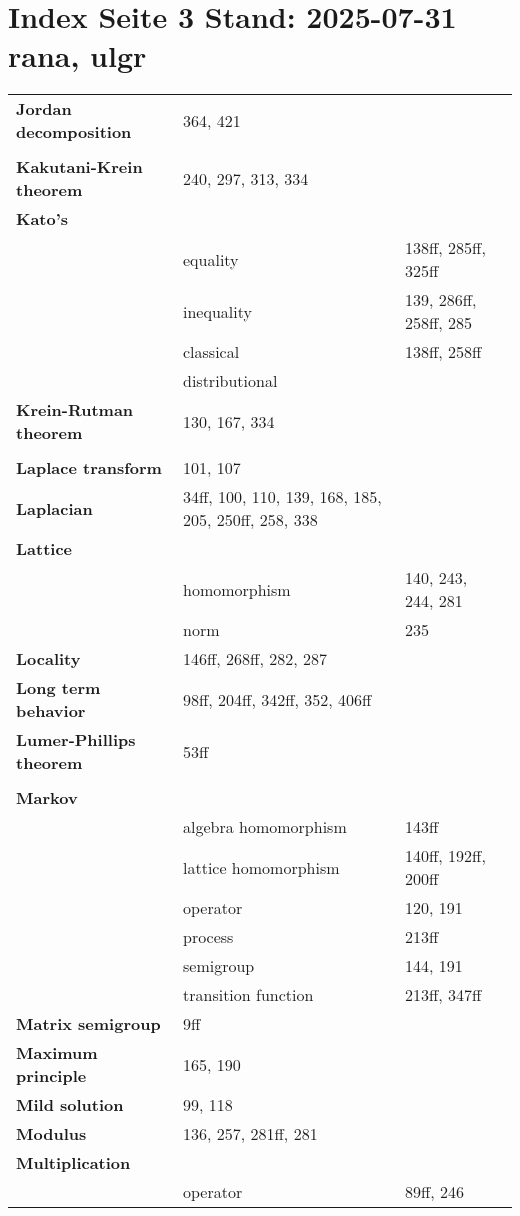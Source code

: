\documentclass[10pt]{scrartcl}
\begin{document}
\pagestyle{empty}
\section*{Index Seite 3 Stand: 2025-07-31 rana, ulgr}
\begin{longtable}{>{\bfseries}p{4cm}p{4cm}p{4cm}p{4cm}}

Jordan decomposition 	& 364, 421 \\
	& \\
Kakutani-Krein theorem 	& 240, 297, 313, 334 \\
Kato's 	& \\
	& equality 	& 138ff, 285ff, 325ff\\
	& inequality 	& 139, 286ff, 258ff, 285 \\
	& classical 	& 138ff, 258ff \\
	& distributional 	& \\
Krein-Rutman theorem 	& 130, 167, 334 \\
	& \\
Laplace transform 	& 101, 107 \\
Laplacian 	&  34ff, 100, 110, 139, 168, 185, 205, 250ff, 258, 338 \\
Lattice 	& \\
	& homomorphism 	& 140, 243, 244, 281 \\
	& norm 	& 235 \\
Locality 	& 146ff, 268ff, 282, 287 \\
Long term behavior 	& 98ff, 204ff, 342ff, 352, 406ff \\
Lumer-Phillips theorem 	& 53ff \\
	& \\
Markov 	& \\
	& algebra homomorphism 	& 143ff \\
	& lattice homomorphism 	& 140ff, 192ff, 200ff \\
	& operator 	& 120, 191 \\
	& process 	& 213ff \\
	& semigroup 	& 144, 191 \\
	& transition function 	& 213ff, 347ff \\
Matrix semigroup 	& 9ff \\
Maximum principle 	& 165, 190 \\
Mild solution 	& 99, 118 \\
Modulus 	& 136, 257, 281ff, 281 \\
Multiplication 	& \\
	& operator 	& 89ff, 246 \\

\end{longtable}
\end{document}
